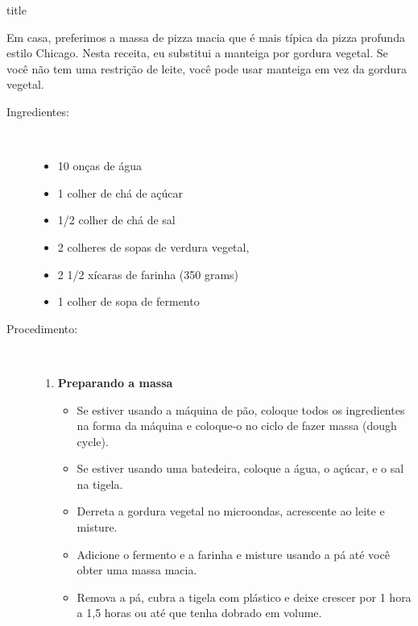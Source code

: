 \documentclass [11pt, letterpaper] {article}
\begin{document}
 {title}

Em casa, preferimos a massa de pizza macia que é mais típica da pizza profunda estilo Chicago. Nesta receita, eu substitui a manteiga por gordura vegetal. Se você não tem uma restrição de leite, você pode usar manteiga em vez da gordura vegetal.

\vspace {0.3in}

\begin {description}

\item [Ingredientes:] \ \\
\begin {itemize}
\item 10 onças de água
\item 1 colher de chá de açúcar
\item 1/2 colher de chá de sal
\item 2 colheres de sopas de verdura vegetal,
\item 2 1/2 xícaras de farinha (350 grams)
\item 1 colher de sopa de fermento
\end {itemize}

\item [Procedimento:] \ \\

\begin {enumerate}
\item {\bf Preparando a massa}
\begin {itemize}
\item Se estiver usando a máquina de pão, coloque todos os ingredientes na forma da m\'aquina e coloque-o no ciclo de fazer massa (dough cycle).
\item Se estiver usando uma batedeira, coloque a \'agua, o açúcar, e o sal na tigela.
\item Derreta a gordura vegetal no microondas, acrescente ao leite e misture.
\item Adicione o fermento e a farinha e misture usando a pá at\'e você obter uma massa macia.
\item Remova a pá, cubra a tigela com pl\'astico e deixe crescer por 1 hora a 1,5 horas ou até que tenha dobrado em volume.
\end {itemize}


\end{enumerate}
\end{description}
\end{document}
